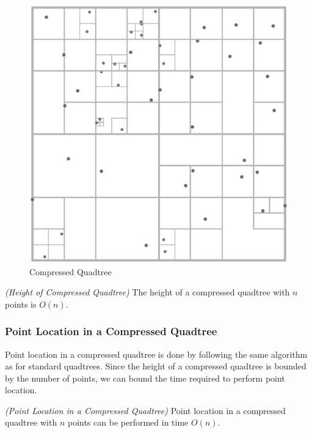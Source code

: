 \documentclass[mcs]{scsthesis}
\begin{document}
\begin{figure}
\begin{center}
\includegraphics[scale=0.35]{diagrams/compressed_quadtree.eps}
\caption{Compressed Quadtree}
\end{center}
\end{figure}

\begin{thm} \emph{(Height of Compressed Quadtree)}
The height of a compressed quadtree with $n$ points is \(O(n)\).
\end{thm}

\subsubsection{Point Location in a Compressed Quadtree}

Point location in a compressed quadtree is done by following the same algorithm
as for standard quadtrees. Since the height of a compressed quadtree is
bounded by the number of points, we can bound the time required to perform
point location.

\begin{thm} \emph{(Point Location in a Compressed Quadtree)} 
Point location in a compressed quadtree with $n$ points can be performed in
time \(O(n)\). 
\end{thm}
\end{document}
